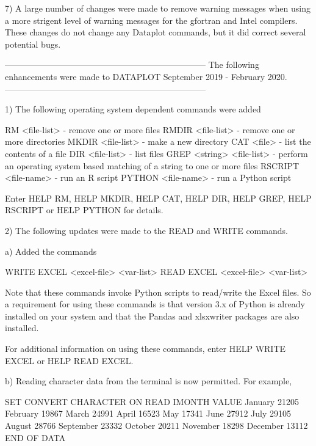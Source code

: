  7) A large number of changes were made to remove warning messages
    when using a more strigent level of warning messages for the
    gfortran and Intel compilers.  These changes do not change
    any Dataplot commands, but it did correct several potential
    bugs.

-----------------------------------------------------------------------
The following enhancements were made to DATAPLOT
September 2019 - February 2020.
-----------------------------------------------------------------------

 1) The following operating system dependent commands were added

      RM      <file-list>    - remove one or more files
      RMDIR   <file-list>    - remove one or more directories
      MKDIR   <file-list>    - make a new directory
      CAT     <file>         - list the contents of a file
      DIR     <file-list>    - list files
      GREP <string> <file-list> - perform an operating system based
                                  matching of a string to one or more
                                  files
      RSCRIPT <file-name>    - run an R script
      PYTHON <file-name>     - run a Python script

    Enter HELP RM, HELP MKDIR, HELP CAT, HELP DIR, HELP GREP,
    HELP RSCRIPT or HELP PYTHON for details.

 2) The following updates were made to the READ and WRITE commands.

    a) Added the commands

          WRITE EXCEL <excel-file>  <var-list>
          READ  EXCEL <excel-file>  <var-list>

       Note that these commands invoke Python scripts to read/write the
       Excel files.  So a requirement for using these commands is that
       version 3.x of Python is already installed on your system and that
       the Pandas and xlsxwriter packages are also installed.

       For additional information on using these commands, enter
       HELP WRITE EXCEL or HELP READ EXCEL.

    b) Reading character data from the terminal is now permitted.
       For example,

          SET CONVERT CHARACTER ON
          READ IMONTH VALUE
          January    21205
          February   19867
          March      24991
          April      16523
          May        17341
          June       27912
          July       29105
          August     28766
          September  23332
          October    20211
          November   18298
          December   13112
          END OF DATA


